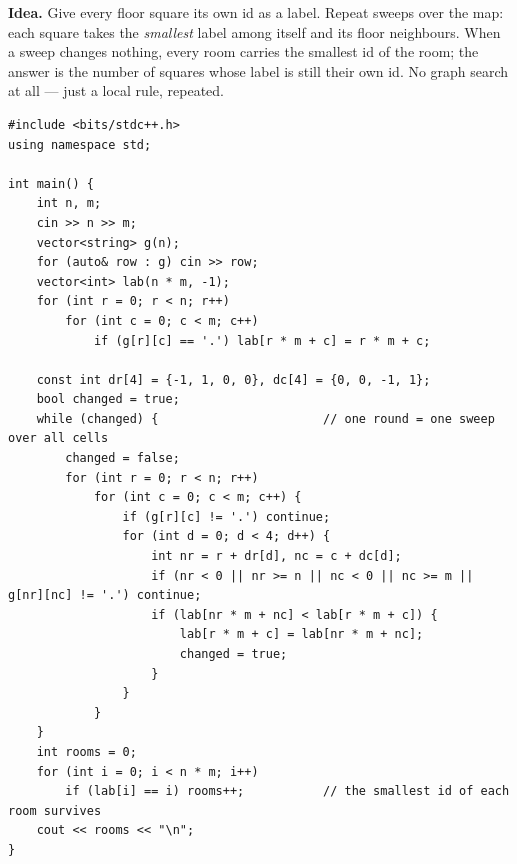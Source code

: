 \begin{bruteforcebox}
\textbf{Idea.} Give every floor square its own id as a label. Repeat sweeps over the map: each square takes the \emph{smallest} label among itself and its floor neighbours. When a sweep changes nothing, every room carries the smallest id of the room; the answer is the number of squares whose label is still their own id. No graph search at all --- just a local rule, repeated.

\begin{lstlisting}[style=cpp]
#include <bits/stdc++.h>
using namespace std;

int main() {
    int n, m;
    cin >> n >> m;
    vector<string> g(n);
    for (auto& row : g) cin >> row;
    vector<int> lab(n * m, -1);
    for (int r = 0; r < n; r++)
        for (int c = 0; c < m; c++)
            if (g[r][c] == '.') lab[r * m + c] = r * m + c;

    const int dr[4] = {-1, 1, 0, 0}, dc[4] = {0, 0, -1, 1};
    bool changed = true;
    while (changed) {                       // one round = one sweep over all cells
        changed = false;
        for (int r = 0; r < n; r++)
            for (int c = 0; c < m; c++) {
                if (g[r][c] != '.') continue;
                for (int d = 0; d < 4; d++) {
                    int nr = r + dr[d], nc = c + dc[d];
                    if (nr < 0 || nr >= n || nc < 0 || nc >= m || g[nr][nc] != '.') continue;
                    if (lab[nr * m + nc] < lab[r * m + c]) {
                        lab[r * m + c] = lab[nr * m + nc];
                        changed = true;
                    }
                }
            }
    }
    int rooms = 0;
    for (int i = 0; i < n * m; i++)
        if (lab[i] == i) rooms++;           // the smallest id of each room survives
    cout << rooms << "\n";
}
\end{lstlisting}


\end{bruteforcebox}
